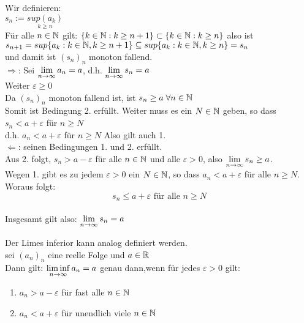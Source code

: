 \documentclass[../ana1u.tex]{subfiles}
\begin{document}
\begin{bew}
    Wir definieren:\\
    \(s_n := \underset{k \geq n}{sup(a_k)}\)\\
    Für alle \(n \in \mathbb{N}\) gilt: \(\{k \in \mathbb{N}: k \geq n+1\} \subset \{k \in \mathbb{N}: k \geq n\}\) also ist\\
    \(s_{n+1} = sup\{a_k: k \in \mathbb{N}, k \geq n+1\} \subseteq sup\{a_k: k \in \mathbb{N}, k \geq n\} = s_n\)\\
    und damit ist \((s_n)_n\) monoton fallend.\\
    \(\Rightarrow\): Sei \(\lim\limits_{n\rightarrow\infty} a_n = a\), d.h. \(\lim\limits_{n\rightarrow\infty} s_n = a\)\\
    Weiter \(\varepsilon \geq 0\)\\
    Da \((s_n)_n\) monoton fallend ist, ist \(s_n \geq a \; \forall n \in \mathbb{N}\)\\
    Somit ist Bedingung 2. erfüllt. Weiter muss es ein \(N \in \mathbb{N}\) geben, so dass \(s_n < a + \varepsilon\) für \(n \geq N\)\\
    d.h. \(a_n < a + \varepsilon\) für \(n \geq N\) Also gilt auch 1.\\
    \(\Leftarrow\): seinen Bedingungen 1. und 2. erfüllt.\\
    Aus 2. folgt, \(s_n > a - \varepsilon\) für alle \(n \in \mathbb{N}\) und alle \(\varepsilon > 0\), also \(\lim\limits_{n\rightarrow\infty} s_n \geq a\).\\
    Wegen 1. gibt es zu jedem \(\varepsilon > 0\) ein \(N \in \mathbb{N}\), so dass \(a_n < a + \varepsilon\) für alle \(n \geq N\).\\
    Woraus folgt:\\
    \[s_n \leq a + \varepsilon \text{ für alle } n \geq N\]\\
    Insgesamt gilt also: \(\lim\limits_{n\rightarrow\infty} s_n = a\)\\
\end{bew}
\begin{bem}
    Der Limes inferior kann analog definiert werden.\\
    sei \((a_n)_n\) eine reelle Folge und \(a \in \mathbb{R}\)\\
    Dann gilt: \(\liminf\limits_{n\rightarrow\infty} a_n = a\) genau dann,wenn für jedes \(\varepsilon > 0\) gilt:
    \begin{enumerate}
        \item \(a_n > a - \varepsilon\) für fast alle \(n \in \mathbb{N}\)
        \item \(a_n < a + \varepsilon\) für unendlich viele \(n \in \mathbb{N}\)
    \end{enumerate}
\end{bem}
\end{document}
